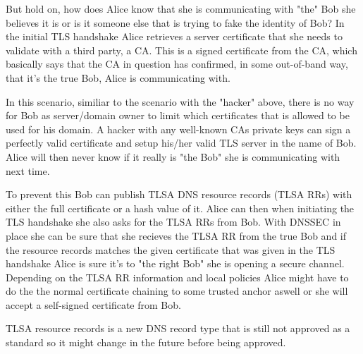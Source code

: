 But hold on, how does Alice know that she is communicating with "the" Bob she believes it is or is it someone else that is trying to fake the identity of Bob?
In the initial TLS handshake Alice retrieves a server certificate that she needs to validate with a third party, a CA.
This is a signed certificate from the CA, which basically says that the CA in question has confirmed, in some out-of-band way, that it's the true Bob, Alice is communicating with.

In this scenario, similiar to the scenario with the "hacker" above, there is no way for Bob as server/domain owner to limit which certificates that is allowed to be used for his domain.
A hacker with any well-known CAs private keys can sign a perfectly valid certificate and setup his/her valid TLS server in the name of Bob.
Alice will then never know if it really is "the Bob" she is communicating with next time.

To prevent this Bob can publish TLSA DNS resource records (TLSA RRs)\cite[ch. 2]{rfc:draft-dane} with either the full certificate or a hash value of it.
Alice can then when initiating the TLS handshake she also asks for the TLSA RRs from Bob.
With DNSSEC in place she can be sure that she recieves the TLSA RR from the true Bob and if the resource records matches the given certificate that was given in the TLS handshake Alice is sure it's to "the right Bob" she is opening a secure channel.
Depending on the TLSA RR information and local policies Alice might have to do the the normal certificate chaining to some trusted anchor aswell or she will accept a self-signed certificate from Bob.


TLSA resource records is a new DNS record type that is still not approved as a standard so it might change in the future before being approved.

